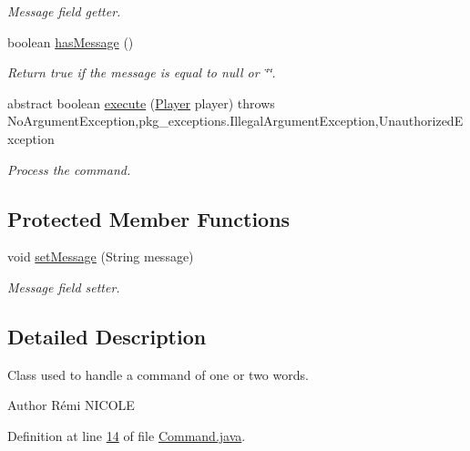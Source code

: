 \begin{DoxyCompactItemize}
\begin{DoxyCompactList}\small\item\em Message field getter. \end{DoxyCompactList}\item 
boolean \hyperlink{classpkg__commands_1_1Command_ae46bb048d0fa705a5037a5204b530da2}{has\-Message} ()
\begin{DoxyCompactList}\small\item\em Return true if the message is equal to null or \char`\"{}\char`\"{}. \end{DoxyCompactList}\item 
abstract boolean \hyperlink{classpkg__commands_1_1Command_a19008923c75a87c87d1f3ba8bf8be43f}{execute} (\hyperlink{classpkg__world_1_1Player}{Player} player)  throws No\-Argument\-Exception,pkg\-\_\-exceptions.\-Illegal\-Argument\-Exception,\-Unauthorized\-Exception
\begin{DoxyCompactList}\small\item\em Process the command. \end{DoxyCompactList}\end{DoxyCompactItemize}
\subsection*{Protected Member Functions}
\begin{DoxyCompactItemize}
\item 
void \hyperlink{classpkg__commands_1_1Command_ae210ff216fe908b111ba1c988a963d13}{set\-Message} (String message)
\begin{DoxyCompactList}\small\item\em Message field setter. \end{DoxyCompactList}\end{DoxyCompactItemize}


\subsection{Detailed Description}
Class used to handle a command of one or two words. 

\begin{DoxyAuthor}{Author}
Rémi N\-I\-C\-O\-L\-E 
\end{DoxyAuthor}


Definition at line \hyperlink{Command_8java_source_l00014}{14} of file \hyperlink{Command_8java_source}{Command.\-java}.



